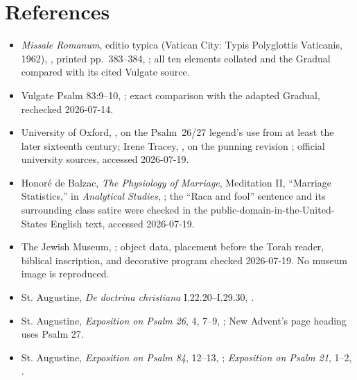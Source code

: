 \section*{References}
{\footnotesize
\begin{itemize}[itemsep=0em,topsep=0.15em,parsep=0pt]
\item \emph{Missale Romanum}, editio typica (Vatican City: Typis Polyglottis Vaticanis, 1962), , printed pp.~383--384, ; all ten elements collated and the Gradual compared with its cited Vulgate source.
\item Vulgate Psalm 83:9--10, ; exact comparison with the adapted Gradual, rechecked 2026-07-14.
\item University of Oxford, , on the Psalm~26/27 legend's use from at least the later sixteenth century; Irene Tracey, , on the punning revision ; official university sources, accessed 2026-07-19.
\item Honoré de Balzac, \emph{The Physiology of Marriage}, Meditation II, ``Marriage Statistics,'' in \emph{Analytical Studies}, ; the ``Raca and fool'' sentence and its surrounding class satire were checked in the public-domain-in-the-United-States English text, accessed 2026-07-19.
\item The Jewish Museum, ; object data, placement before the Torah reader, biblical inscription, and decorative program checked 2026-07-19. No museum image is reproduced.
\item St. Augustine, \emph{De doctrina christiana} I.22.20--I.29.30, .
\item St. Augustine, \emph{Exposition on Psalm 26}, 4, 7--9, ; New Advent's page heading uses Psalm 27.
\item St. Augustine, \emph{Exposition on Psalm 84}, 12--13, ; \emph{Exposition on Psalm 21}, 1--2, .

\end{itemize}}
